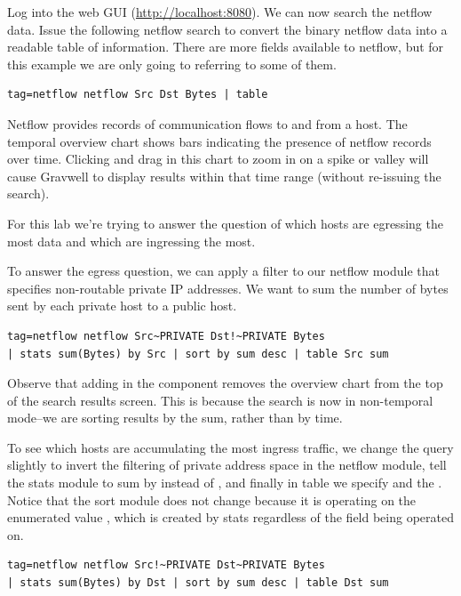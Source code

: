 Log into the web GUI (\href{http://localhost:8080}{http://localhost:8080}).
We can now search the netflow data. Issue the following netflow search to convert the binary netflow data
into a readable table of information. There are more fields available to
netflow, but for this example we are only going to referring to some of
them.

\begin{Verbatim}[breaklines=true]
tag=netflow netflow Src Dst Bytes | table
\end{Verbatim}

Netflow provides records of communication flows to and from a host. The
temporal overview chart shows bars indicating the presence of netflow
records over time. Clicking and drag in this chart to zoom in on a spike or
valley will cause Gravwell to display results within that time
range (without re-issuing the search).

For this lab we're trying to answer the question of which hosts are
egressing the most data and which are ingressing the most.

To answer the egress question, we can apply a filter to our netflow
module that specifies non-routable private IP addresses. We want to sum
the number of bytes sent by each private host to a public host.

\begin{Verbatim}[breaklines=true]
tag=netflow netflow Src~PRIVATE Dst!~PRIVATE Bytes
| stats sum(Bytes) by Src | sort by sum desc | table Src sum
\end{Verbatim}

Observe that adding in the  component removes the
overview chart from the top of the search results screen. This is
because the search is now in non-temporal mode--we are sorting results by
the sum, rather than by time.

To see which hosts are accumulating the most ingress traffic, we change
the query slightly to invert the filtering of private address space in
the netflow module, tell the stats module to sum by  instead of ,
and finally in table we specify  and the . Notice that the sort
module does not change because it is operating on the enumerated value
, which is created by stats regardless of the field being operated
on.

\begin{Verbatim}[breaklines=true]
tag=netflow netflow Src!~PRIVATE Dst~PRIVATE Bytes
| stats sum(Bytes) by Dst | sort by sum desc | table Dst sum
\end{Verbatim}

